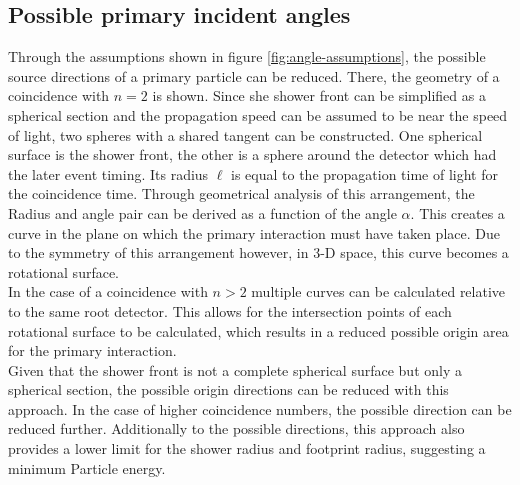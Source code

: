\documentclass[abstract,toc,los,lof,english,10pt,glossary,acronyms]{jluthesis}
\begin{document}
\subsection{Possible primary incident angles}
Through the assumptions shown in figure \ref{fig:angle-assumptions}, the possible source directions of a primary particle can be reduced. There, the geometry of a coincidence with $n=2$ is shown. Since she shower front can be simplified as a spherical section and the propagation speed can be assumed to be near the speed of light, two spheres with a shared tangent can be constructed. One spherical surface is the shower front, the other is a sphere around the detector which had the later event timing. Its radius $\ell$ is equal to the propagation time of light for the coincidence time. Through geometrical analysis of this arrangement, the Radius and angle pair can be derived as a function of the angle $\alpha$. This creates a curve in the plane on which the primary interaction must have taken place. Due to the symmetry of this arrangement however, in 3-D space, this curve becomes a rotational surface. \\
In the case of a coincidence with $n>2$ multiple curves can be calculated relative to the same root detector. This allows for the intersection points of each rotational surface to be calculated, which results in a reduced possible origin area for the primary interaction. \\
Given that the shower front is not a complete spherical surface but only a spherical section, the possible origin directions can be reduced with this approach. In the case of higher coincidence numbers, the possible direction can be reduced further. Additionally to the possible directions, this approach also provides a lower limit for the shower radius and footprint radius, suggesting a minimum Particle energy.
\end{document}
